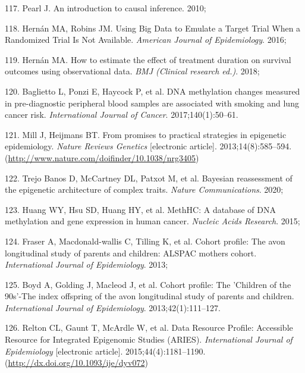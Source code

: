 \documentclass[11pt,oneside]{bristolthesis}
\newenvironment{cslreferences}%
  {}%
  {\par}
\begin{document}
\begin{cslreferences}
\leavevmode\hypertarget{ref-Pearl2010}{}%
117. Pearl J. An introduction to causal inference. 2010;

\leavevmode\hypertarget{ref-Hernan2016}{}%
118. Hernán MA, Robins JM. Using Big Data to Emulate a Target Trial When a Randomized Trial Is Not Available. \emph{American Journal of Epidemiology}. 2016;

\leavevmode\hypertarget{ref-Hernan2018}{}%
119. Hernán MA. How to estimate the effect of treatment duration on survival outcomes using observational data. \emph{BMJ (Clinical research ed.)}. 2018;

\leavevmode\hypertarget{ref-Baglietto2017}{}%
120. Baglietto L, Ponzi E, Haycock P, et al. DNA methylation changes measured in pre-diagnostic peripheral blood samples are associated with smoking and lung cancer risk. \emph{International Journal of Cancer}. 2017;140(1):50--61.

\leavevmode\hypertarget{ref-Mill2013}{}%
121. Mill J, Heijmans BT. From promises to practical strategies in epigenetic epidemiology. \emph{Nature Reviews Genetics} {[}electronic article{]}. 2013;14(8):585--594. (\url{http://www.nature.com/doifinder/10.1038/nrg3405})

\leavevmode\hypertarget{ref-TrejoBanos2020}{}%
122. Trejo Banos D, McCartney DL, Patxot M, et al. Bayesian reassessment of the epigenetic architecture of complex traits. \emph{Nature Communications}. 2020;

\leavevmode\hypertarget{ref-Huang2015}{}%
123. Huang WY, Hsu SD, Huang HY, et al. MethHC: A database of DNA methylation and gene expression in human cancer. \emph{Nucleic Acids Research}. 2015;

\leavevmode\hypertarget{ref-Fraser2013}{}%
124. Fraser A, Macdonald-wallis C, Tilling K, et al. Cohort profile: The avon longitudinal study of parents and children: ALSPAC mothers cohort. \emph{International Journal of Epidemiology}. 2013;

\leavevmode\hypertarget{ref-Boyd2013}{}%
125. Boyd A, Golding J, Macleod J, et al. Cohort profile: The 'Children of the 90s'-The index offspring of the avon longitudinal study of parents and children. \emph{International Journal of Epidemiology}. 2013;42(1):111--127.

\leavevmode\hypertarget{ref-Relton2015-aries}{}%
126. Relton CL, Gaunt T, McArdle W, et al. Data Resource Profile: Accessible Resource for Integrated Epigenomic Studies (ARIES). \emph{International Journal of Epidemiology} {[}electronic article{]}. 2015;44(4):1181--1190. (\url{http://dx.doi.org/10.1093/ije/dyv072})


\end{cslreferences}
\end{document}
